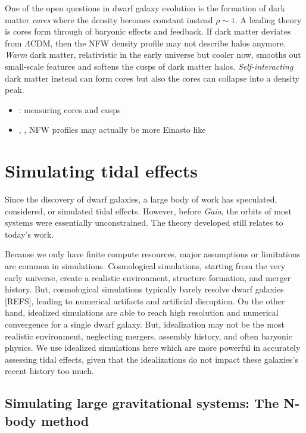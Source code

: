 One of the open questions in dwarf galaxy evolution is the formation of
dark matter \emph{cores} where the density becomes constant instead
\(\rho \sim 1\). A leading theory is cores form through of baryonic
effects and feedback. If dark matter deviates from \(\Lambda\)CDM, then
the NFW density profile may not describe halos anymore. \emph{Warm} dark
matter, relativistic in the early universe but cooler now, smooths out
small-scale features and softens the cusps of dark matter halos.
\emph{Self-interacting} dark matter instead can form cores but also the
cores can collapse into a density peak.

\begin{itemize}
\tightlist
\item
  \citet{walker+penarrubia2011}: measuring cores and cusps
\item
  \citet{dicintio+2013}, \citet{navarro+2010}, NFW profiles may actually
  be more Einasto like
\end{itemize}

\section{Simulating tidal effects}\label{simulating-tidal-effects}

Since the discovery of dwarf galaxies, a large body of work has
speculated, considered, or simulated tidal effects. However, before
\emph{Gaia}, the orbits of most systems were essentially unconstrained.
The theory developed still relates to today's work.

Because we only have finite compute resources, major assumptions or
limitations are common in simulations. Cosmological simulations,
starting from the very early universe, create a realistic environment,
structure formation, and merger history. But, cosmological simulations
typically barely resolve dwarf galaxies {[}REFS{]}, leading to numerical
artifacts and artificial disruption. On the other hand, idealized
simulations are able to reach high resolution and numerical convergence
for a single dwarf galaxy. But, idealization may not be the most
realistic environment, neglecting mergers, assembly history, and often
baryonic physics. We use idealized simulations here which are more
powerful in accurately assessing tidal effects, given that the
idealizations do not impact these galaxies's recent history too much.

\subsection{Simulating large gravitational systems: The N-body
method}\label{simulating-large-gravitational-systems-the-n-body-method}


